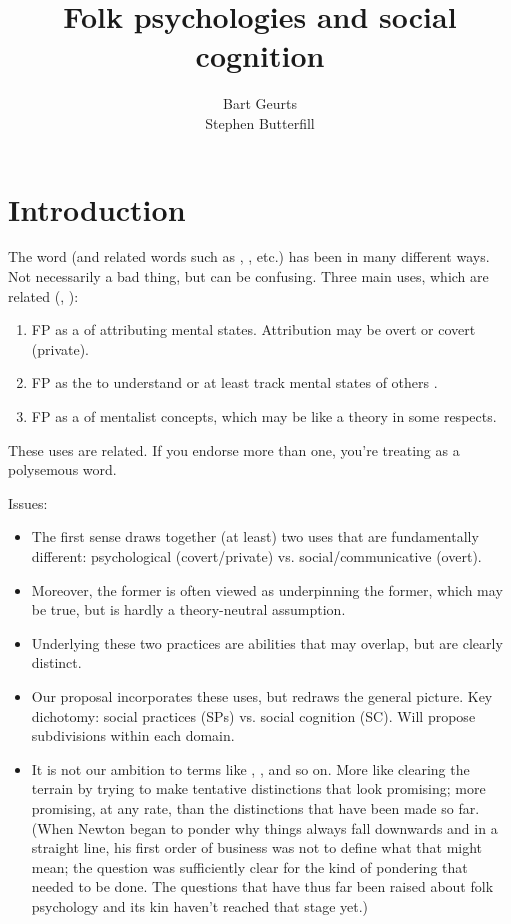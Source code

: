 \documentclass[12pt]{article}
\title{Folk psychologies and social cognition}
\author{Bart Geurts \\ Stephen Butterfill}
\date{}
\begin{document}
\maketitle

\section{Introduction}
The word  (and related words such as , , etc.) has been in many different ways. Not necessarily a bad thing, but can be confusing. Three main uses, which are related (, ):
\begin{enumerate}{\small 1.}
\item FP as a  of attributing mental states. Attribution may be overt or covert (private).
\item FP as the  to understand or at least track mental states of others \cite{Butterfill:2019}.
\item FP as a  of mentalist concepts, which may be like a theory in some respects.
\end{enumerate}
These uses are related. If you endorse more than one, you're treating   as a polysemous word.

\noindent Issues:
\begin{itemize}
\item The first sense draws together (at least) two uses that are fundamentally different: psychological (covert/private) vs. social/communicative (overt). 
\item Moreover, the former is often viewed as underpinning the former, which may be true, but is hardly a theory-neutral assumption.
\item Underlying these two practices are abilities that may overlap, but are clearly distinct.
\item Our proposal incorporates these uses, but redraws the general picture. Key dichotomy: social practices (SPs) vs. social cognition (SC). Will propose subdivisions within each domain.
\item It is not our ambition to  terms like , , and so on. More like clearing the terrain by trying to make tentative distinctions that look promising; more promising, at any rate, than the distinctions that have been made so far. (When Newton began to ponder why things always fall downwards and in a straight line, his first order of business was not to define what that might mean; the question was sufficiently clear for the kind of pondering that needed to be done. The questions that have thus far been raised about folk psychology and its kin haven't reached that stage yet.)
\end{itemize}
\end{document}
